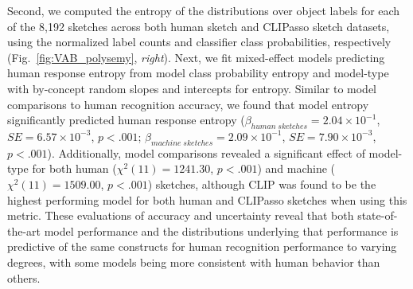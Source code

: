 \documentclass[10pt,letterpaper]{article}
\begin{document}
Second, we computed the entropy of the distributions over object labels for each of the 8,192 sketches across both human sketch and CLIPasso sketch datasets, using the normalized label counts and classifier class probabilities, respectively (Fig.~\ref{fig:VAB_polysemy}, \textit{right}). 
Next, we fit mixed-effect models predicting human response entropy from model class probability entropy and model-type with by-concept random slopes and intercepts for entropy. 
Similar to model comparisons to human recognition accuracy, we found that model entropy significantly predicted human response entropy ($\beta_{human \; sketches}=2.04 \times10^{-1}$, $SE=6.57\times10^{-3}$, $p<.001$; $\beta_{machine \; sketches} = 2.09 \times10^{-1}$, $SE = 7.90 \times10^{-3}$, $p<.001$). 
Additionally, model comparisons revealed a significant effect of model-type for both human ($\chi^2(11) = 1241.30$, $p<.001$) and machine ($\chi^2(11) = 1509.00$, $p<.001$) sketches, although CLIP was found to be the highest performing model for both human and CLIPasso sketches when using this metric.
These evaluations of accuracy and uncertainty reveal that both state-of-the-art model performance and the distributions underlying that performance is predictive of the same constructs for human recognition performance to varying degrees, with some models being more consistent with human behavior than others. 


\end{document}
